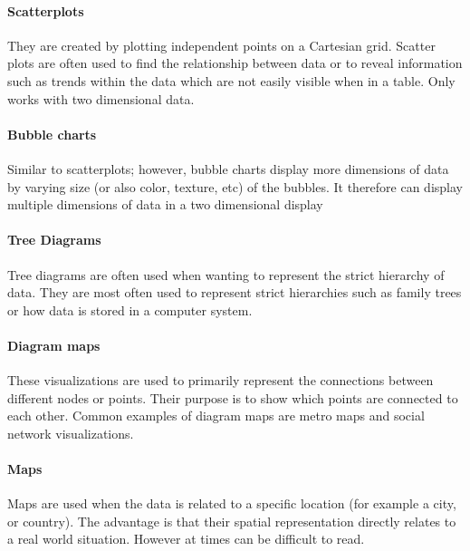 \paragraph{Scatterplots}
They are created by plotting independent points on a Cartesian grid. Scatter plots are often used to find the relationship between data or to reveal information such as trends within the data which are not easily visible when in a table. Only works with two dimensional data.

\paragraph{Bubble charts}
Similar to scatterplots; however, bubble charts display more dimensions of data by varying size (or also color, texture, etc) of the bubbles. It therefore can display multiple dimensions of data in a two dimensional display

\paragraph{Tree Diagrams}
Tree diagrams are often used when wanting to represent the strict hierarchy of data. They are most often used to represent strict hierarchies such as family trees or how data is stored in a computer system.

\paragraph{Diagram maps}
These visualizations are used to primarily represent the connections between different nodes or points. Their purpose is to show which points are connected to each other. Common examples of diagram maps are metro maps and social network visualizations.

\paragraph{Maps}
Maps are used when the data is related to a specific location (for example a city, or country). The advantage is that their spatial representation directly relates to a real world situation. However at times can be difficult to read.

